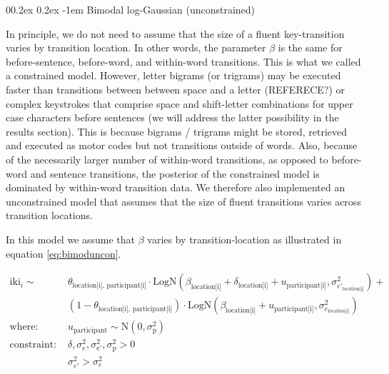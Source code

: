 \documentclass[
  english,
  man,floatsintext]{apa7}
\makeatletter
\let\oldparagraph\paragraph
\renewcommand{\paragraph}[1]{\oldparagraph{#1}\mbox{}}
\renewcommand{\paragraph}{\@startsection{paragraph}{4}{\parindent}%
  {0\baselineskip \@plus 0.2ex \@minus 0.2ex}%
  {-1em}%
  {\normalfont\normalsize\bfseries\itshape\typesectitle}}
\makeatother
\begin{document}
\hypertarget{bimodal-log-gaussian-unconstrained}{%
\paragraph{Bimodal log-Gaussian (unconstrained)}\label{bimodal-log-gaussian-unconstrained}}

In principle, we do not need to assume that the size of a fluent key-transition varies by transition location. In other words, the parameter \(\beta\) is the same for before-sentence, before-word, and within-word transitions. This is what we called a constrained model. However, letter bigrams (or trigrams) may be executed faster than transitions between between space and a letter (REFERECE?) or complex keystrokes that comprise space and shift-letter combinations for upper case characters before sentences (we will address the latter possibility in the results section). This is because bigrams / trigrams might be stored, retrieved and executed as motor codes but not transitions outside of words. Also, because of the necessarily larger number of within-word transitions, as opposed to before-word and sentence transitions, the posterior of the constrained model is dominated by within-word transition data. We therefore also implemented an unconstrained model that assumes that the size of fluent transitions varies across transition locations.

In this model we assume that \(\beta\) varies by transition-location as illustrated in equation \ref{eq:bimoduncon}.

\begin{equation}
\begin{aligned}
\label{eq:bimoduncon}
\text{iki}_{i} \sim\text{ } & \theta_\text{location[i], participant[i]} \cdot \text{LogN}(\beta_\text{location[i]} + \delta_\text{location[i]} + u_\text{participant[i]}, \sigma_{e'_\text{location[i]}}^2) + \\
  & (1 - \theta_\text{location[i], participant[i]}) \cdot \text{LogN}(\beta_\text{location[i]} + u_\text{participant[i]}, \sigma_{e_\text{location[i]}}^2)\\
    \text{where: }  & u_\text{participant} \sim \text{N}(0, \sigma_\text{p}^2) \\
\text{constraint: } & \delta, \sigma_{e}^2, \sigma_\text{e'}^2, \sigma_\text{p}^2>0\\
        & \sigma_{e'}^2 > \sigma_{e}^2
\end{aligned}
\end{equation}
\end{document}
